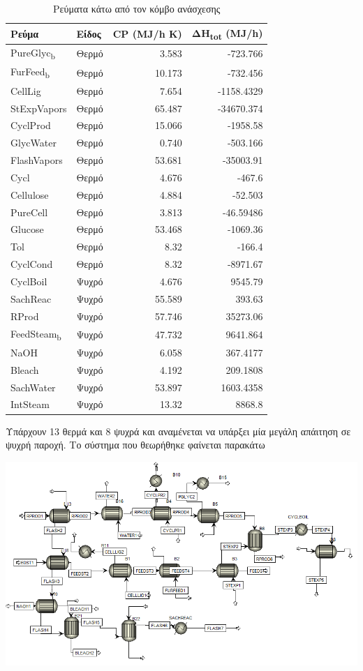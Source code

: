 \documentclass[11pt]{article}
\begin{document}
\begin{table}[htbp]
\caption{Ρεύματα κάτω από τον κόμβο ανάσχεσης}
\centering
\begin{tabular}{llrr}
Ρεύμα & Είδος & CP (MJ/h K) & ΔΗ\textsubscript{tot} (MJ/h)\\
\hline
PureGlyc\textsubscript{b} & Θερμό & 3.583 & -723.766\\
FurFeed\textsubscript{b} & Θερμό & 10.173 & -732.456\\
CellLig & Θερμό & 7.654 & -1158.4329\\
StExpVapors & Θερμό & 65.487 & -34670.374\\
CyclProd & Θερμό & 15.066 & -1958.58\\
GlycWater & Θερμό & 0.740 & -503.166\\
FlashVapors & Θερμό & 53.681 & -35003.91\\
Cycl & Θερμό & 4.676 & -467.6\\
Cellulose & Θερμό & 4.884 & -52.503\\
PureCell & Θερμό & 3.813 & -46.59486\\
Glucose & Θερμό & 53.468 & -1069.36\\
Tol & Θερμό & 8.32 & -166.4\\
CyclCond & Θερμό & 8.32 & -8971.67\\
\hline
CyclBoil & Ψυχρό & 4.676 & 9545.79\\
SachReac & Ψυχρό & 55.589 & 393.63\\
RProd & Ψυχρό & 57.746 & 35273.06\\
FeedSteam\textsubscript{b} & Ψυχρό & 47.732 & 9641.864\\
NaOH & Ψυχρό & 6.058 & 367.4177\\
Bleach & Ψυχρό & 4.192 & 209.1808\\
SachWater & Ψυχρό & 53.897 & 1603.4358\\
IntSteam & Ψυχρό & 13.32 & 8868.8\\
\end{tabular}
\end{table}

Υπάρχουν 13 θερμά και 8 ψυχρά και αναμένεται να υπάρξει μία μεγάλη απάιτηση σε ψυχρή παροχή. Το σύστημα που θεωρήθηκε φαίνεται παρακάτω

\begin{center}
\includegraphics[width=.9\linewidth]{2023-04-14_19-38-26_screenshot.png}
\end{center}
\end{document}
